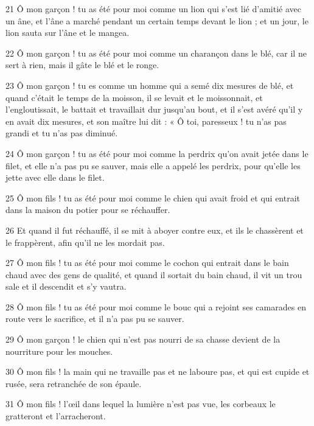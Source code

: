 \par 21 Ô mon garçon ! tu as été pour moi comme un lion qui s'est lié d'amitié avec un âne, et l'âne a marché pendant un certain temps devant le lion ; et un jour, le lion sauta sur l'âne et le mangea.

\par 22 Ô mon garçon ! tu as été pour moi comme un charançon dans le blé, car il ne sert à rien, mais il gâte le blé et le ronge.

\par 23 Ô mon garçon ! tu es comme un homme qui a semé dix mesures de blé, et quand c'était le temps de la moisson, il se levait et le moissonnait, et l'engloutissait, le battait et travaillait dur jusqu'au bout, et il s'est avéré qu'il y en avait dix mesures, et son maître lui dit : « Ô toi, paresseux ! tu n'as pas grandi et tu n'as pas diminué.

\par 24 Ô mon garçon ! tu as été pour moi comme la perdrix qu'on avait jetée dans le filet, et elle n'a pas pu se sauver, mais elle a appelé les perdrix, pour qu'elle les jette avec elle dans le filet.

\par 25 Ô mon fils ! tu as été pour moi comme le chien qui avait froid et qui entrait dans la maison du potier pour se réchauffer.

\par 26 Et quand il fut réchauffé, il se mit à aboyer contre eux, et ils le chassèrent et le frappèrent, afin qu'il ne les mordait pas.

\par 27 Ô mon fils ! tu as été pour moi comme le cochon qui entrait dans le bain chaud avec des gens de qualité, et quand il sortait du bain chaud, il vit un trou sale et il descendit et s'y vautra.

\par 28 Ô mon fils ! tu as été pour moi comme le bouc qui a rejoint ses camarades en route vers le sacrifice, et il n'a pas pu se sauver.

\par 29 Ô mon garçon ! le chien qui n'est pas nourri de sa chasse devient de la nourriture pour les mouches.

\par 30 Ô mon fils ! la main qui ne travaille pas et ne laboure pas, et qui est cupide et rusée, sera retranchée de son épaule.

\par 31 Ô mon fils ! l'œil dans lequel la lumière n'est pas vue, les corbeaux le gratteront et l'arracheront.

